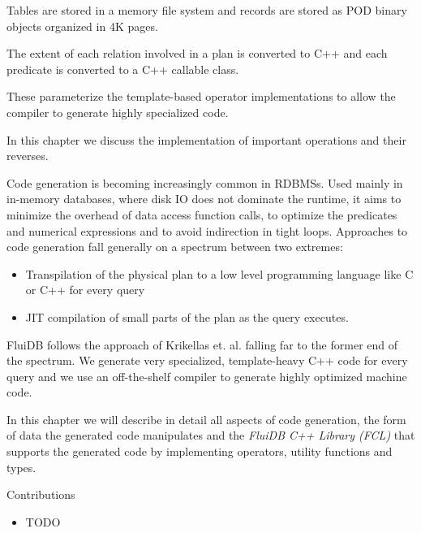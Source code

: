 
\begin{summary}
\item Tables are stored in a memory file system and records are
  stored as POD binary objects organized in 4K pages.
\item The extent of each relation involved in a plan is converted to
  C++  and each predicate is converted to a C++ callable
  class.
\item These parameterize the template-based operator implementations to allow the
  compiler to generate highly specialized code.
\item In this chapter we discuss the implementation of important
  operations and their reverses.
\end{summary}

Code generation is becoming increasingly common in RDBMSs. Used
mainly in in-memory databases, where disk IO does not dominate the
runtime, it aims to minimize the overhead of data access function
calls, to optimize the predicates and numerical expressions and to
avoid indirection in tight loops. Approaches to code generation fall
generally on a spectrum between two extremes:

\begin{itemize}
\item Transpilation of the physical plan to a low level programming
  language like C or C++ for every query
\item JIT compilation of small parts of the plan as the query
  executes.
\end{itemize}

FluiDB follows the approach of Krikellas
et. al. \cite{krikellasGeneratingCodeHolistic2010} falling far to the
former end of the spectrum. We generate very specialized,
template-heavy C++ code for every query and we use an off-the-shelf
compiler to generate highly optimized machine code.

In this chapter we will describe in detail all aspects of code
generation, the form of data the generated code manipulates and the
\emph{FluiDB C++ Library (FCL)} that supports the generated code by
implementing operators, utility functions and types.

\begin{correction}{Contributions}
  \begin{itemize}
  \item TODO
  \end{itemize}
\end{correction}



